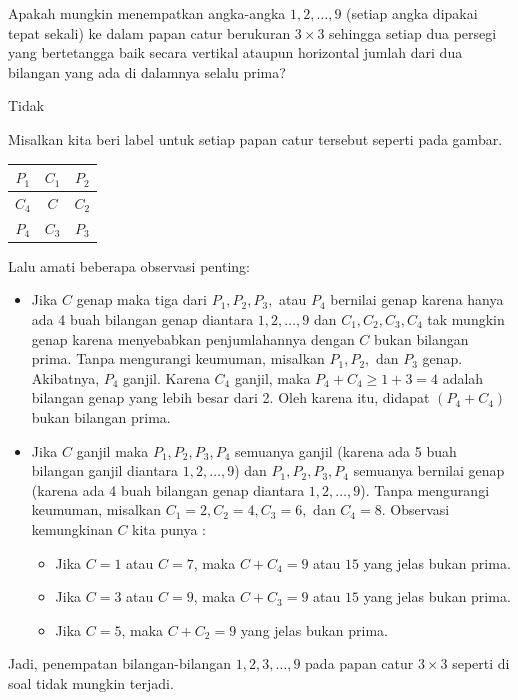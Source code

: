 \documentclass[12pt]{scrartcl}
\begin{document}
	\begin{soalbaru} 
		Apakah mungkin menempatkan angka-angka $1,2,\dots,9$ (setiap angka dipakai tepat sekali) ke dalam papan catur berukuran $3\times 3$ sehingga setiap dua persegi yang bertetangga baik secara vertikal ataupun horizontal jumlah dari dua bilangan yang ada di dalamnya selalu prima?
		\begin{jawaban}
		Tidak
		\end{jawaban}
		\begin{solusi}
		
		Misalkan kita beri label untuk setiap papan catur tersebut seperti pada gambar. 
		
		\begin{center}
				\begin{tabular}{|c|c|c|}
				\hline
				$P_1$ & $C_1$ & $P_2$ \\
				\hline
				$C_4$ & $C$   &  $C_2$\\
				\hline
				$P_4$ & $C_3$ & $P_3$\\
				\hline
				\end{tabular}
				\end{center}
		Lalu amati beberapa observasi penting:
		\begin{itemize}
		\item Jika $C$ genap maka tiga dari $P_1,P_2,P_3,$ atau $P_4$ bernilai genap karena hanya ada 4 buah bilangan genap diantara $1,2,\dots,9$ dan $C_1,C_2,C_3,C_4$ tak mungkin genap karena menyebabkan penjumlahannya dengan $C$ bukan bilangan prima. Tanpa mengurangi keumuman, misalkan $P_1,P_2, $ dan $P_3$ genap. Akibatnya, $P_4$ ganjil. Karena $C_4$ ganjil, maka $P_4+C_4 \ge 1 + 3 =4$ adalah bilangan genap yang lebih besar dari 2. Oleh karena itu, didapat $(P_4 +C_4)$ bukan bilangan prima.
		\item Jika $C$ ganjil maka $P_1,P_2,P_3,P_4$  semuanya ganjil (karena ada 5 buah bilangan ganjil diantara $1,2,\dots,9$) dan $P_1,P_2,P_3,P_4$ semuanya bernilai genap (karena ada 4 buah bilangan genap diantara $1,2,\dots,9$). Tanpa mengurangi keumuman, misalkan $C_1=2,C_2=4,C_3=6,$ dan $C_4=8$. Observasi kemungkinan $C$ kita punya : 
		\begin{itemize}
		\item Jika $C=1$ atau $C=7$, maka $C+C_4 =9$ atau $15$ yang jelas bukan prima.
		\item Jika $C=3$ atau $C=9$, maka $C+C_3 =9$ atau $15$ yang jelas bukan prima.
		\item Jika $C=5$, maka $C+C_2 =9$ yang jelas bukan prima.
		\end{itemize}
		\end{itemize}
		Jadi, penempatan bilangan-bilangan $1,2,3,\dots,9$ pada papan catur $3 \times 3$ seperti di soal tidak mungkin terjadi.
		\end{solusi}
	\end{soalbaru}
\end{document}
